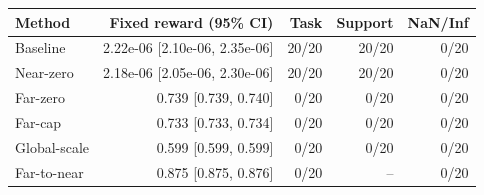 \begin{tabular}{@{}lrrrr@{}}
\toprule
Method & Fixed reward (95\% CI) & Task & Support & NaN/Inf \\
\midrule
Baseline & 2.22e-06 [2.10e-06, 2.35e-06] & 20/20 & 20/20 & 0/20 \\
Near-zero & 2.18e-06 [2.05e-06, 2.30e-06] & 20/20 & 20/20 & 0/20 \\
Far-zero & 0.739 [0.739, 0.740] & 0/20 & 0/20 & 0/20 \\
Far-cap & 0.733 [0.733, 0.734] & 0/20 & 0/20 & 0/20 \\
Global-scale & 0.599 [0.599, 0.599] & 0/20 & 0/20 & 0/20 \\
Far-to-near & 0.875 [0.875, 0.876] & 0/20 & -- & 0/20 \\
\bottomrule
\end{tabular}

